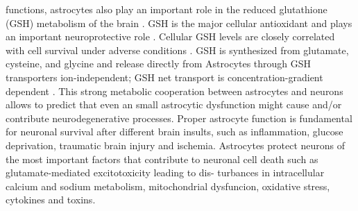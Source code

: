 functions, astrocytes also play an important role in the reduced glutathione (GSH) metabolism of the brain \cite{Raps1989}. GSH is the major cellular antioxidant and plays an important neuroprotective role \cite{Jha2016}. Cellular GSH levels are closely correlated with cell survival under adverse conditions \cite{Allaman2011}. GSH is synthesized from glutamate, cysteine, and glycine and release directly from Astrocytes through GSH transporters ion-independent; GSH net transport is concentration-gradient dependent \cite{Wang2000}. This strong metabolic cooperation between astrocytes and neurons allows to predict that even an small astrocytic dysfunction might cause and/or contribute neurodegenerative processes. Proper astrocyte function is fundamental for neuronal survival after different brain insults, such as inflammation, glucose deprivation, traumatic brain injury and ischemia. Astrocytes protect neurons of the most important factors that contribute to neuronal cell death such as glutamate-mediated excitotoxicity leading to dis- turbances in intracellular calcium and sodium metabolism, mitochondrial dysfuncion, oxidative stress, cytokines and toxins.

